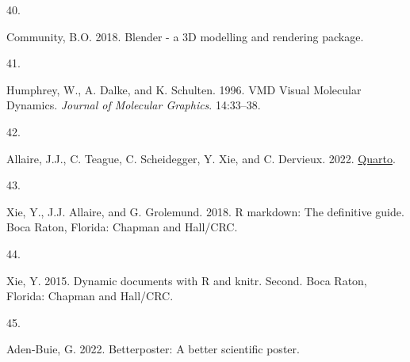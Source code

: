 \documentclass[
  letterpaper,
  DIV=11,
  numbers=noendperiod]{scrartcl}
\newlength{\cslhangindent}
\newlength{\csllabelwidth}
\newlength{\cslentryspacingunit} %
\newenvironment{CSLReferences}[2] %
 {%
  \setlength{\parindent}{0pt}
  \ifodd #1
  \let\oldpar\par
  \def\par{\hangindent=\cslhangindent\oldpar}
  \fi
  \setlength{\parskip}{#2\cslentryspacingunit}
 }%
 {}
\newcommand{\CSLLeftMargin}[1]{\parbox[t]{\csllabelwidth}{#1}}
\newcommand{\CSLRightInline}[1]{\parbox[t]{\linewidth - \csllabelwidth}{#1}\break}
\begin{document}
\begin{CSLReferences}{0}{0}
\leavevmode{}%
\CSLLeftMargin{40. }
\CSLRightInline{Community, B.O. 2018. Blender - a {3D} modelling and
rendering package.}

\leavevmode{}%
\CSLLeftMargin{41. }
\CSLRightInline{Humphrey, W., A. Dalke, and K. Schulten. 1996. {VMD}
\textendash{} {Visual Molecular Dynamics}. \emph{Journal of Molecular
Graphics}. 14:33--38.}

\leavevmode{}%
\CSLLeftMargin{42. }
\CSLRightInline{Allaire, J.J., C. Teague, C. Scheidegger, Y. Xie, and C.
Dervieux. 2022. \href{https://doi.org/10.5281/zenodo.5960048}{Quarto}.}

\leavevmode{}%
\CSLLeftMargin{43. }
\CSLRightInline{Xie, Y., J.J. Allaire, and G. Grolemund. 2018. R
markdown: {The} definitive guide. {Boca Raton, Florida}: {Chapman and
Hall/CRC}.}

\leavevmode{}%
\CSLLeftMargin{44. }
\CSLRightInline{Xie, Y. 2015. Dynamic documents with {R} and knitr.
Second. {Boca Raton, Florida}: {Chapman and Hall/CRC}.}

\leavevmode{}%
\CSLLeftMargin{45. }
\CSLRightInline{Aden-Buie, G. 2022. Betterposter: {A} better scientific
poster.}

\end{CSLReferences}
\end{document}
